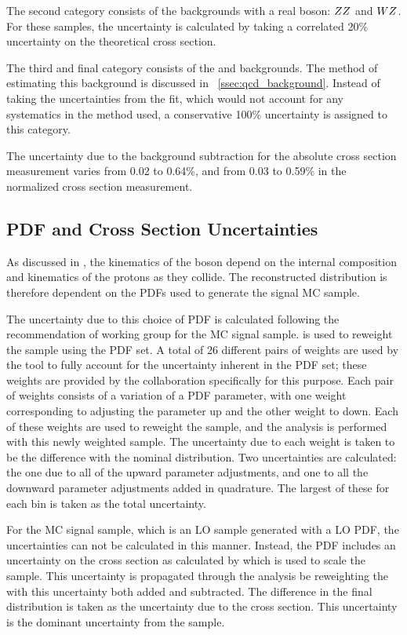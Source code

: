 The second category consists of the backgrounds with a real \Z boson: $ZZ$
and $WZ$. For these samples, the uncertainty is calculated by taking a
correlated 20\% uncertainty on the theoretical cross section.

The third and final category consists of the \QCDjets and \wjets
backgrounds. The method of estimating this background is discussed in
\SEC~\ref{ssec:qcd_background}. Instead of taking the uncertainties from the
fit, which would not account for any systematics in the method used, a
conservative 100\% uncertainty is assigned to this category.

The uncertainty due to the background subtraction for the absolute cross
section measurement varies from 0.02 to 0.64\%, and from 0.03 to 0.59\% in the
normalized cross section measurement.

\subsection{PDF and Cross Section Uncertainties}
\label{ssec:pdf_uncertainties}

As discussed in , the kinematics of
the \Z boson depend on the internal composition and kinematics of the protons
as they collide. The reconstructed \phistar distribution is therefore dependent
on the PDFs used to generate the signal MC sample.

The uncertainty due to this choice of PDF is calculated following the
recommendation of \PDFforLHC working group for the \POWHEG MC signal sample.
\PDFWeightProducer is used to reweight the \POWHEG sample using the \CTten PDF
set. A total of \num{26} different pairs of weights are used by the tool to
fully account for the uncertainty inherent in the PDF set; these weights are
provided by the \CTten collaboration specifically for this purpose. Each pair
of weights consists of a variation of a PDF parameter, with one weight
corresponding to adjusting the parameter up and the other weight to down. Each of
these weights are used to reweight the \POWHEG sample, and the analysis is
performed with this newly weighted sample.
The uncertainty due to each weight is taken to be the difference with the
nominal \phistar distribution. Two uncertainties are calculated: the
one due to all of the upward parameter adjustments, and one to all the downward
parameter adjustments added in quadrature. The largest of these for each
\phistar bin is taken as the total uncertainty.

For the \MADGRAPH MC signal sample, which is an LO sample generated with a LO
PDF, the uncertainties can not be calculated in this manner. Instead, the PDF
includes an uncertainty on the cross section as calculated by \FEWZ which is
used to scale the sample. This uncertainty is propagated through the analysis
be reweighting the \MADGRAPH with this uncertainty both added and subtracted.
The difference in the final \phistar distribution is taken as the uncertainty
due to the \FEWZ cross section. This uncertainty is the dominant uncertainty
from the \MADGRAPH sample.

